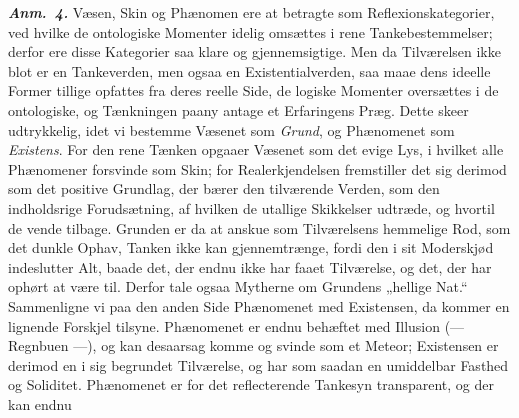 \documentclass[12pt]{book}
\newcommand{\anm}[1]{\emph{\textbf{Anm.~#1.}}}
\newcommand{\opage}[1]{\marginnote{\footnotesize\textit{[#1]}}}
\begin{document}
\anm{4} Væsen, Skin og Phænomen ere at betragte som Reflexionskategorier, ved hvilke
de ontologiske Momenter idelig omsættes i rene Tankebestemmelser; derfor ere
\opage{126} %
disse Kategorier saa klare og gjennemsigtige. Men da Tilværelsen ikke blot er en
Tankeverden, men ogsaa en Existentialverden, saa maae dens ideelle Former tillige
opfattes fra deres reelle Side, de logiske Momenter oversættes i de ontologiske, og
Tænkningen paany antage et Erfaringens Præg. Dette skeer udtrykkelig, idet vi
bestemme Væsenet som \emph{Grund}, og Phænomenet som \emph{Existens}. For den rene
Tænken opgaaer Væsenet som det evige Lys, i hvilket alle Phænomener forsvinde som
Skin; for Realerkjendelsen fremstiller det sig derimod som det positive Grundlag, der
bærer den tilværende Verden, som den indholdsrige Forudsætning, af hvilken de utallige
Skikkelser udtræde, og hvortil de vende tilbage. Grunden er da at anskue som
Tilværelsens hemmelige Rod, som det dunkle Ophav, Tanken ikke kan gjennemtrænge,
fordi den i sit Moderskjød indeslutter Alt, baade det, der endnu ikke har faaet
Tilværelse, og det, der har ophørt at være til. Derfor tale ogsaa Mytherne om
Grundens „hellige Nat.“ Sammenligne vi paa den anden Side Phænomenet med Existensen,
da kommer en lignende Forskjel tilsyne. Phænomenet er endnu behæftet med Illusion
(--- Regnbuen ---), og kan desaarsag komme og svinde som et Meteor; Existensen er
derimod en i sig begrundet Tilværelse, og har som saadan en umiddelbar Fasthed og
Soliditet. Phænomenet er for det reflecterende Tankesyn transparent, og der kan endnu
\end{document}
